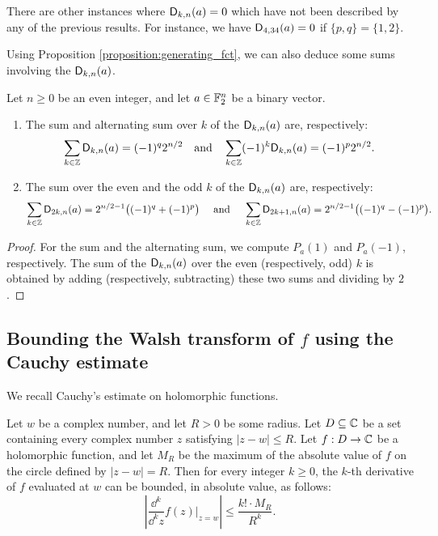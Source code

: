 \documentclass{llncs}
\begin{document}
\begin{remark}
    There are other instances where $\Dnka nka=0$ which have not been described by any of the previous results. For instance, we have $\Dnka{34}4a=0$ if $\{p,q\}=\{1,2\}$.
\end{remark}

Using Proposition \ref{proposition:generating_fct}, we can also deduce some sums involving the $\Dnka nka$.

\begin{proposition}
    Let $n\geq 0$ be an even integer, and let $a\in\F_2^n$ be a binary vector.
    \begin{enumerate}
        \item The sum and alternating sum over $k$ of the $\Dnka nka$ are, respectively:
		\[
			\sum_{k\in\Z}\Dnka nka=(-1)^{q}2^{n/2} \quad \text{and} \quad
			\sum_{k\in\Z}(-1)^k\Dnka nka=(-1)^{p}2^{n/2}.
		\]
        \item The sum over the even and the odd $k$ of the $\Dnka nka$ are, respectively:
		\[
			\sum_{k\in\Z}\Dnka n{2k}a=2^{n/2-1}\big((-1)^{q}+(-1)^{p}\big) \quad \text{ and } \quad 
			\sum_{k\in\Z}\Dnka n{2k+1}a=2^{n/2-1}\big((-1)^{q}-(-1)^{p}\big).
		\]
    \end{enumerate}
\end{proposition}

\begin{proof}
	For the sum and the alternating sum, we compute $P_a(1)$ and $P_a(-1)$, respectively. 
	The sum of the $\Dnka nka$ over the even (respectively, odd) $k$ is obtained by adding (respectively, subtracting) these two sums and dividing by $2$.
\end{proof}

\subsection{Bounding the Walsh transform of $f$ using the Cauchy estimate}\label{sec:Cauchy}

We recall Cauchy's estimate on holomorphic functions.

\begin{Prop}\label{property:cauchy_estimate}
    Let $w$ be a complex number, and let $R>0$ be some radius. Let $D\subseteq\C$ be a set containing every complex number $z$ satisfying $|z-w|\leq R$. Let $f:D\to\C$ be a holomorphic function, and let $M_R$ be the maximum of the absolute value of $f$ on the circle defined by $|z-w|=R$. Then for every integer $k\geq 0$, the $k$-th derivative of $f$ evaluated at $w$ can be bounded, in absolute value, as follows:
    \[
        \left|\frac{\dd^k}{\dd^k z}f(z)\vert_{z=w}\right|\leq\frac{k!\cdot M_R}{R^k}.
    \]
\end{Prop}
\end{document}
